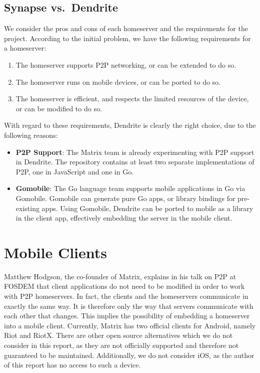 \subsection{Synapse vs.~Dendrite}\label{sec:synapse_vs_dendrite}
We consider the pros and cons of each homeserver and the requirements for the project.
According to the initial problem, we have the following requirements for a homeserver:
\begin{enumerate}
	\item{
	      The homeserver supports \ac{P2P} networking, or can be extended to do so.
	      }
	\item{
	      The homeserver runs on mobile devices, or can be ported to do so.
	      }
	\item{
	      The homeserver is efficient, and respects the limited resources of the device, or can be modified to do so.
	      }
\end{enumerate}
With regard to these requirements, Dendrite is clearly the right choice, due to the following reasons:
\begin{itemize}
	\item{
	      \textbf{\ac{P2P} Support}:
	      The Matrix team is already experimenting with \ac{P2P} support in Dendrite.
	      The repository contains at least two separate implementations of \ac{P2P}, one in JavaScript and one in Go\cite{fosdem_event_p2p_matrix}.
	      }
	\item{
	      \textbf{Gomobile}:
	      The Go language team supports mobile applications in Go via Gomobile\cite{gomobile}.
	      Gomobile can generate pure Go apps, or library bindings for pre-existing apps.
	      Using Gomobile, Dendrite can be ported to mobile as a library in the client app, effectively embedding the server in the mobile client.
	      }
\end{itemize}

\section{Mobile Clients}\label{sec:official_clients}
Matthew Hodgson, the co-founder of Matrix, explains in his talk on \ac{P2P} at FOSDEM\cite{fosdem_event_p2p_matrix} that client applications do not need to be modified in order to work with \ac{P2P} homeservers.
In fact, the clients and the homeservers communicate in exactly the same way.
It is therefore only the way that servers communicate with each other that changes.
This implies the possibility of embedding a homeserver into a mobile client.
Currently, Matrix has two official clients for Android, namely Riot and RiotX.
There are other open source alternatives which we do not consider in this report, as they are not officially supported and therefore not guaranteed to be maintained.
Additionally, we do not consider iOS, as the author of this report has no access to such a device.

